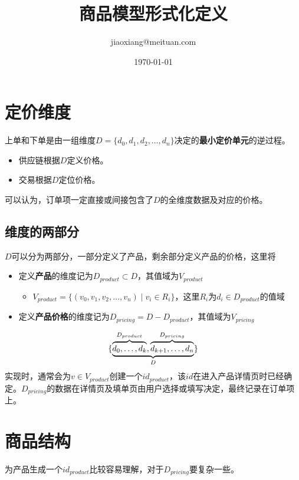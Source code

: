 \documentclass[a4paper]{article}
\title{商品模型形式化定义}
\author{jiaoxiang@meituan.com}
\date{\today}
\begin{document}
 
\maketitle

\section{定价维度}
上单和下单是由一组维度$D=\{d_0, d_1, d_2,\ldots, d_n\}$决定的\textbf{最小定价单元}的逆过程。
\begin{itemize} 
    \item 供应链根据$D$定义价格。
    \item 交易根据$D$定位价格。
\end{itemize}
可以认为，订单项一定直接或间接包含了$D$的全维度数据及对应的价格。

\subsection{维度的两部分}
$D$可以分为两部分，一部分定义了产品，剩余部分定义产品的价格，这里将
\begin{itemize}
    \item 定义\textbf{产品}的维度记为$D_{product} \subset D$，其值域为$V_{product}$
    \begin{itemize}
        \item $V_{product} = \{(v_0, v_1, v_2, \ldots, v_n) \mid v_i \in R_i\}$，这里$R_i$为$d_i \in D_{product}$的值域
    \end{itemize}
    \item 定义\textbf{产品价格}的维度记为$D_{pricing} = D - D_{product}$，其值域为$V_{pricing}$
\end{itemize}
\begin{equation}
    \{\underbrace{%
        \overbrace{\mathstrut d_0,\ldots,d_k}^{D_{product}},
        \overbrace{\mathstrut d_{k+1},\ldots,d_n}^{D_{pricing}}}
    _{D} \}
\end{equation}
实现时，通常会为$v \in V_{product}$创建一个$id_{product}$，该$id$在进入产品详情页时已经确定。$D_{pricing}$的数据在详情页及填单页由用户选择或填写决定，最终记录在订单项上。

\section{商品结构}
为产品生成一个$id_{product}$比较容易理解，对于$D_{pricing}$要复杂一些。
\end{document}
